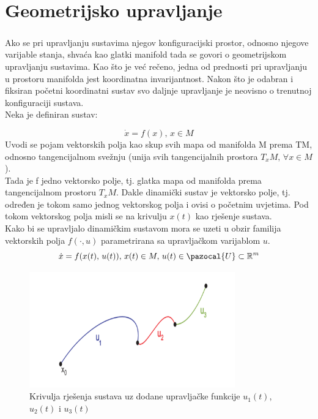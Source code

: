 \documentclass[times, utf8, diplomski, numeric]{fer}
\newcommand{\Ua}{\pazocal{U}}
\begin{document}
\chapter{Geometrijsko upravljanje}
	
	\paragraph{}Ako se pri upravljanju sustavima njegov konfiguracijski prostor, odnosno njegove varijable stanja, shvaća kao glatki manifold tada se govori o geometrijskom upravljanju sustavima. Kao što je već rečeno, jedna od prednosti pri upravljanju u prostoru manifolda jest koordinatna invarijantnost. Nakon što je odabran i fiksiran početni koordinatni sustav svo daljnje upravljanje je neovisno o trenutnoj konfiguraciji sustava. \\
	Neka je definiran sustav:
	
	\begin{equation}
		\dot{x}=f(x), \, x \in M
	\end{equation}
	Uvodi se pojam vektorskih polja kao skup svih mapa od manifolda M prema TM, odnosno tangencijalnom svežnju (unija svih tangencijalnih prostora $T_xM ,\, \forall x\in M$). \\
	Tada je f jedno vektorsko polje, tj. glatka mapa od manifolda prema tangencijalnom prostoru $T_xM$. Dakle dinamički sustav je vektorsko polje, tj. određen je tokom samo jednog vektorskog polja i ovisi o početnim uvjetima. Pod tokom vektorskog polja misli se na krivulju $x(t)$ kao rješenje sustava. \\
	Kako bi se upravljalo dinamičkim sustavom mora se uzeti u obzir familija vektorskih polja $f(\cdot, u)$ parametrirana sa upravljačkom varijablom $u$. \\
	\begin{equation}
		\dot{x} = f(x(t),\, u(t)), \, x(t)\in M, \, u(t)\in \Ua \subset \mathbb{R}^m
	\end{equation}
	\begin{figure}[h!]
		\includegraphics[width=\textwidth, height=5cm]{figures/krivulja.png}
		\caption{Krivulja rješenja sustava uz dodane upravljačke funkcije $u_1(t)$, $u_2(t)$ i $u_3(t)$}
	\end{figure}
	
\end{document}

